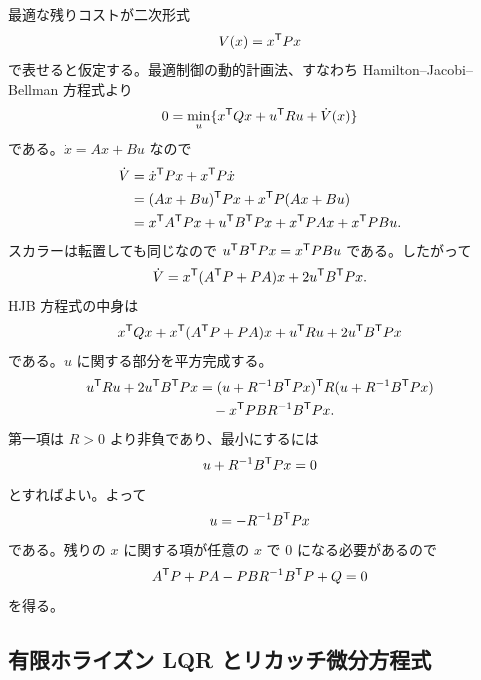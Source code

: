 \begin{derivation}
最適な残りコストが二次形式
\begin{equation}
  V(x)=x^{\mathsf{T}} Px
\end{equation}
で表せると仮定する。最適制御の動的計画法、すなわち Hamilton--Jacobi--Bellman 方程式より
\begin{equation}
  0=\min_u\{x^{\mathsf{T}} Qx+u^{\mathsf{T}} Ru+\dot{V}(x)\}
\end{equation}
である。$\dot{x}=Ax+Bu$ なので
\begin{align}
  \dot{V}
  &=\dot{x}^{\mathsf{T}} Px+x^{\mathsf{T}} P\dot{x}\\
  &=(Ax+Bu)^{\mathsf{T}} Px+x^{\mathsf{T}} P(Ax+Bu)\\
  &=x^{\mathsf{T}} A^{\mathsf{T}} Px+u^{\mathsf{T}} B^{\mathsf{T}} Px+x^{\mathsf{T}} PAx+x^{\mathsf{T}} PBu.
\end{align}
スカラーは転置しても同じなので $u^{\mathsf{T}} B^{\mathsf{T}} Px=x^{\mathsf{T}} PBu$ である。したがって
\begin{equation}
  \dot{V}=x^{\mathsf{T}}(A^{\mathsf{T}} P+PA)x+2u^{\mathsf{T}} B^{\mathsf{T}} Px.
\end{equation}
HJB 方程式の中身は
\begin{equation}
  x^{\mathsf{T}} Qx+x^{\mathsf{T}}(A^{\mathsf{T}} P+PA)x+u^{\mathsf{T}} Ru+2u^{\mathsf{T}} B^{\mathsf{T}} Px
\end{equation}
である。$u$ に関する部分を平方完成する。
\begin{align}
  u^{\mathsf{T}} Ru+2u^{\mathsf{T}} B^{\mathsf{T}} Px
  &=(u+R^{-1}B^{\mathsf{T}} Px)^{\mathsf{T}} R(u+R^{-1}B^{\mathsf{T}} Px)\\
  &\quad -x^{\mathsf{T}} PBR^{-1}B^{\mathsf{T}} Px.
\end{align}
第一項は $R>0$ より非負であり、最小にするには
\begin{equation}
  u+R^{-1}B^{\mathsf{T}} Px=0
\end{equation}
とすればよい。よって
\begin{equation}
  u=-R^{-1}B^{\mathsf{T}} Px
\end{equation}
である。残りの $x$ に関する項が任意の $x$ で 0 になる必要があるので
\begin{equation}
  A^{\mathsf{T}} P+PA-PBR^{-1}B^{\mathsf{T}} P+Q=0
\end{equation}
を得る。
\end{derivation}

\subsection{有限ホライズン LQR とリカッチ微分方程式}

